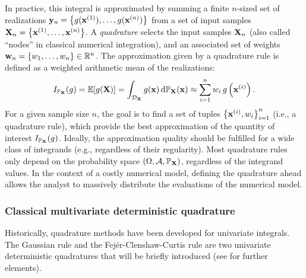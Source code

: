 In practice, this integral is approximated by summing a finite $n$-sized set of realizations ${\bf y}_n = \left\{g({\bf x}^{(1)}), \dots, g({\bf x}^{(n)})\right\}$ from a set of input samples ${\bf X}_n = \left\{{\bf x}^{(1)}, \dots, {\bf x}^{(n)}\right\}$. 
A \textit{quadrature} selects the input samples ${\bf X}_n$ (also called ``nodes'' in classical numerical integration), and an associated set of weights ${\bf w}_n = \{w_1, \dots, w_n\} \in \mathbb{R}^n$. 
The approximation given by a quadrature rule is defined as a weighted arithmetic mean of the realizations:
\begin{equation}
    I_{\mathbb{P}_{{\bf X}}}(g) = \mathbb{E}[g({\bf X})] = \int_{\mathcal{D}_{\bf X}} g({\bf x}) \, \mathrm{d}\mathbb{P}_{{\bf X}}({\bf x}) \approx \sum_{i=1}^n w_i \, g\left({\bf x}^{(i)}\right).
\end{equation}
For a given sample size $n$, the goal is to find a set of tuples $\left\{{\bf x}^{(i)}, w_i \right\}_{i=1}^n$ (i.e., a quadrature rule), which provide the best approximation of the quantity of interest $I_{\mathbb{P}_{{\bf X}}}(g)$. 
Ideally, the approximation quality should be fulfilled for a wide class of integrands (e.g., regardless of their regularity). 
Most quadrature rules only depend on the probability space $(\Omega, \mathcal{A}, \mathbb{P}_{{\bf X}})$, regardless of the integrand values. 
In the context of a costly numerical model, defining the quadrature ahead allows the analyst to massively distribute the evaluations of the numerical model. 



\subsubsection{Classical multivariate deterministic quadrature}

Historically, quadrature methods have been developed for univariate integrals. 
The Gaussian rule and the Fejér-Clenshaw-Curtis rule are two univariate deterministic quadratures that will be briefly introduced (see \citealp{sullivan_2015} for further elements). 

